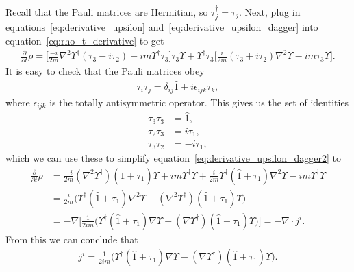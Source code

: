 \documentclass[titlepage,letterpaper,onecolumn,11pt,final]{report}
\numberwithin{equation}{section}
\numberwithin{figure}{section}
\begin{document}
%
Recall that the Pauli matrices are Hermitian, so $\tau_{j}^{\dagger} = \tau_{j}$. Next, plug in equations~\ref{eq:derivative_upsilon} and~\ref{eq:derivative_upsilon_dagger} into equation~\ref{eq:rho_t_derivative} to get
\begin{gather}
	\label{eq:derivative_upsilon_dagger2}
	\frac{\partial}{\partial t} \rho = \bigg[ \frac{-i}{2 m} \nabla^{2} \Upsilon^{\dagger} (\tau_{3} - i \tau_{2}) + i m \Upsilon^{\dagger} \tau_{3} \bigg] \tau_{3} \Upsilon + \Upsilon^{\dagger} \tau_{3} \bigg[ \frac{i}{2 m} (\tau_{3} + i \tau_{2}) \nabla^{2} \Upsilon - i m \tau_{3} \Upsilon \bigg] .
\end{gather}
%
It is easy to check that the Pauli matrices obey 
\begin{gather}
	\tau_{i} \tau_{j} = \delta_{i j} \hat{1} + i \epsilon_{i j k} \tau_{k},
\end{gather}
where $\epsilon_{i j k}$ is the totally antisymmetric operator. This gives us the set of identities
\begin{subequations}
\begin{align}
	\tau_{3} \tau_{3} &= \hat{1}, \\
	\tau_{2} \tau_{3} &= i \tau_{1}, \\
	\tau_{3} \tau_{2} &= -i \tau_{1},
\end{align}
\end{subequations}
which we can use these to simplify equation~\ref{eq:derivative_upsilon_dagger2} to
\begin{equation}
	\begin{split}
	\frac{\partial}{\partial t} \rho &=  \frac{-i}{2 m} \left( \nabla^{2} \Upsilon^{\dagger} \right) (\hat{1} + \tau_{1}) \Upsilon + i m \Upsilon^{\dagger} \Upsilon  +  \frac{i}{2 m} \Upsilon^{\dagger} (\hat{1} + \tau_{1}) \nabla^{2} \Upsilon - i m \Upsilon^{\dagger} \Upsilon \\
	&=  \frac{i}{2 m} \bigg( \Upsilon^{\dagger} (\hat{1} + \tau_{1}) \nabla^{2} \Upsilon - \left( \nabla^{2} \Upsilon^{\dagger} \right) (\hat{1} + \tau_{1}) \Upsilon \bigg) \\
	&= - \nabla \bigg[ \frac{1}{2 i m} \bigg( \Upsilon^{\dagger} (\hat{1} + \tau_{1}) \nabla \Upsilon - \left( \nabla \Upsilon^{\dagger} \right) (\hat{1} + \tau_{1}) \Upsilon \bigg) \bigg] = - \nabla \cdot j^{i} .
\end{split}
\end{equation}
From this we can conclude that
\begin{gather}
	\label{eq:j_intermediate}
	j^{i} = \frac{1}{2 i m} \bigg( \Upsilon^{\dagger} (\hat{1} + \tau_{1}) \nabla \Upsilon - \left( \nabla \Upsilon^{\dagger} \right) (\hat{1} + \tau_{1}) \Upsilon \bigg) .
\end{gather}
\end{document}
